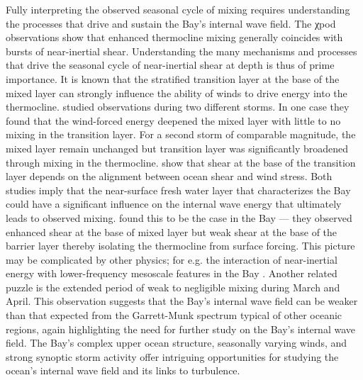 \documentclass[onecol]{ametsoc}
\begin{document}
Fully interpreting the observed seasonal cycle of mixing requires understanding the processes that drive and sustain the Bay's internal wave field.
The χpod observations show that enhanced thermocline mixing generally coincides with bursts of near-inertial shear.
Understanding the many mechanisms and processes that drive the seasonal cycle of near-inertial shear at depth is thus of prime importance.
It is known that the stratified transition layer at the base of the mixed layer can strongly influence the ability of winds to drive energy into the thermocline.
\cite{Dohan2011} studied observations during two different storms. In one case they found that the wind-forced energy deepened the mixed layer with little to no mixing in the transition layer. For a second storm of comparable magnitude, the mixed layer remain unchanged but transition layer was significantly broadened through mixing in the thermocline.
\cite{Brannigan2013} show that shear at the base of the transition layer depends on the alignment between ocean shear and wind stress.
Both studies imply that the near-surface fresh water layer that characterizes the Bay could have a significant influence on the internal wave energy that ultimately leads to observed mixing.
\cite{Lucas2016} found this to be the case in the Bay --- they observed enhanced shear at the base of mixed layer but weak shear at the base of the barrier layer thereby isolating the thermocline from surface forcing.
This picture may be complicated by other physics; for e.g. the interaction of near-inertial energy with lower-frequency mesoscale features in the Bay \citep{Johnston2016}.
Another related puzzle is the extended period of weak to negligible mixing during March and April.
This observation suggests that the Bay's internal wave field can be weaker than that expected from the Garrett-Munk spectrum typical of other oceanic regions, again highlighting the need for further study on the Bay's internal wave field.
The Bay's complex upper ocean structure, seasonally varying winds, and strong synoptic storm activity offer intriguing opportunities for studying the ocean's internal wave field and its links to turbulence.

\acknowledgments
\end{document}
